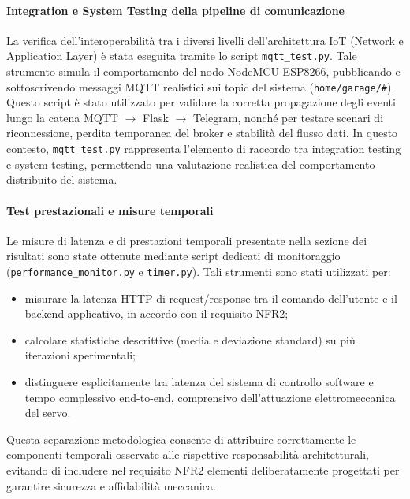 \paragraph{Integration e System Testing della pipeline di comunicazione}
La verifica dell’interoperabilità tra i diversi livelli dell’architettura IoT (Network e Application Layer) è stata eseguita tramite lo script \texttt{mqtt\_test.py}. Tale strumento simula il comportamento del nodo NodeMCU ESP8266, pubblicando e sottoscrivendo messaggi MQTT realistici sui topic del sistema (\texttt{home/garage/\#}).
Questo script è stato utilizzato per validare la corretta propagazione degli eventi lungo la catena MQTT $\rightarrow$ Flask $\rightarrow$ Telegram, nonché per testare scenari di riconnessione, perdita temporanea del broker e stabilità del flusso dati. In questo contesto, \texttt{mqtt\_test.py} rappresenta l’elemento di raccordo tra integration testing e system testing, permettendo una valutazione realistica del comportamento distribuito del sistema.

\paragraph{Test prestazionali e misure temporali}
Le misure di latenza e di prestazioni temporali presentate nella sezione dei risultati sono state ottenute mediante script dedicati di monitoraggio (\texttt{performance\_monitor.py} e \texttt{timer.py}). Tali strumenti sono stati utilizzati per:
\begin{itemize}
    \item misurare la latenza HTTP di request/response tra il comando dell’utente e il backend applicativo, in accordo con il requisito NFR2;
    \item calcolare statistiche descrittive (media e deviazione standard) su più iterazioni sperimentali;
    \item distinguere esplicitamente tra latenza del sistema di controllo software e tempo complessivo end-to-end, comprensivo dell’attuazione elettromeccanica del servo.
\end{itemize}
Questa separazione metodologica consente di attribuire correttamente le componenti temporali osservate alle rispettive responsabilità architetturali, evitando di includere nel requisito NFR2 elementi deliberatamente progettati per garantire sicurezza e affidabilità meccanica.

